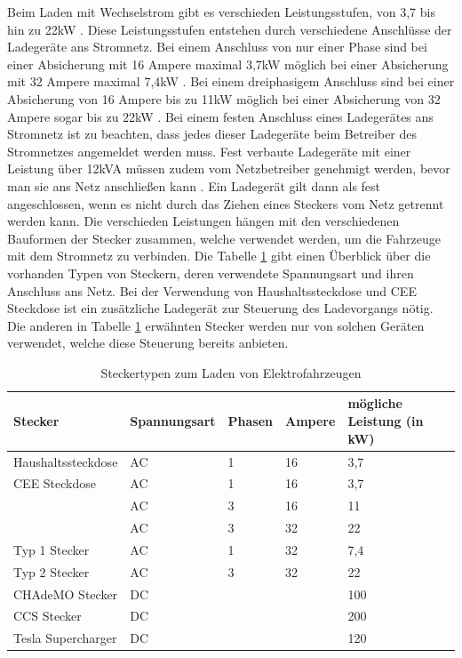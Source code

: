 Beim Laden mit Wechselstrom gibt es verschieden Leistungsstufen, von 3,7 bis hin zu 22kW \cite{laden_1}. Diese Leistungsstufen entstehen durch verschiedene Anschlüsse der Ladegeräte ans Stromnetz. Bei einem Anschluss von nur einer Phase sind bei einer Absicherung mit 16 Ampere maximal 3,7kW möglich bei einer Absicherung mit 32 Ampere maximal 7,4kW \cite{laden_1}. Bei einem dreiphasigem Anschluss sind bei einer Absicherung von 16 Ampere bis zu 11kW möglich bei einer Absicherung von 32 Ampere sogar bis zu 22kW \cite{laden_1}. Bei einem festen Anschluss eines Ladegerätes ans Stromnetz ist zu beachten, dass jedes dieser Ladegeräte beim Betreiber des Stromnetzes angemeldet werden muss. Fest verbaute Ladegeräte mit einer Leistung über 12kVA müssen zudem vom Netzbetreiber genehmigt werden, bevor man sie ans Netz anschließen kann \cite{Lader_anschluss}. Ein Ladegerät gilt dann als fest angeschlossen, wenn es nicht durch das Ziehen eines Steckers vom Netz getrennt werden kann. Die verschieden Leistungen hängen mit den verschiedenen Bauformen der Stecker zusammen, welche verwendet werden, um die Fahrzeuge mit dem Stromnetz zu verbinden. Die Tabelle \ref{tab:table1} gibt einen Überblick über die vorhanden Typen von Steckern, deren verwendete Spannungsart und ihren Anschluss ans Netz. Bei der Verwendung von Haushaltssteckdose und CEE Steckdose ist ein zusätzliche Ladegerät zur Steuerung des Ladevorgangs nötig. Die anderen in Tabelle \ref{tab:table1} erwähnten Stecker werden nur von solchen Geräten verwendet, welche diese Steuerung bereits anbieten.
\begin{table}[bh]
\begin{tabular}{|l|l|l|l|l|}
\hline
Stecker            & Spannungsart & Phasen & Ampere & mögliche Leistung (in kW) \\ \hline \hline
Haushaltssteckdose & AC           & 1      & 16     & 3,7                       \\ \hline
CEE Steckdose      & AC           & 1      & 16     & 3,7                       \\ \cline{2-5} 
                   & AC           & 3      & 16     & 11                        \\ \cline{2-5} 
                   & AC           & 3      & 32     & 22                        \\ \hline
Typ 1 Stecker      & AC           & 1      & 32     & 7,4                       \\ \hline
Typ 2 Stecker      & AC           & 3      & 32     & 22                        \\ \hline
CHAdeMO Stecker    & DC           &        &        & 100                       \\ \hline
CCS Stecker        & DC           &        &        & 200                       \\ \hline
Tesla Supercharger & DC           &        &        & 120                       \\ \hline
\end{tabular}
\caption{Steckertypen zum Laden von Elektrofahrzeugen}
\label{tab:table1}
\end{table}



